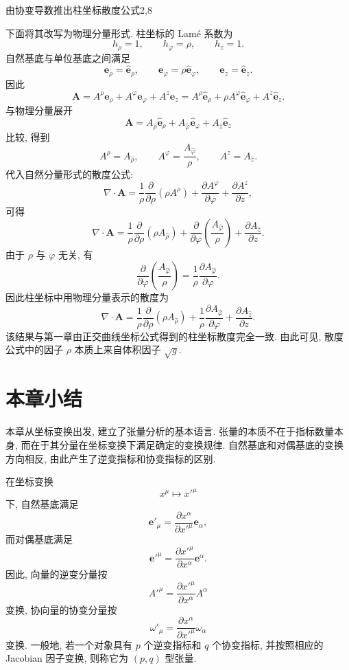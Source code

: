 \begin{example}{由协变导数推出柱坐标散度公式}{2,8}
\begin{solution}
		下面将其改写为物理分量形式. 柱坐标的 Lamé 系数为
		\[
		h_{\rho}=1,
		\qquad
		h_{\varphi}=\rho,
		\qquad
		h_{z}=1.
		\]
		自然基底与单位基底之间满足
		\[
		\bm{e}_{\rho}=\hat{\bm{e}}_{\rho},
		\qquad
		\bm{e}_{\varphi}=\rho\hat{\bm{e}}_{\varphi},
		\qquad
		\bm{e}_{z}=\hat{\bm{e}}_{z}.
		\]
		因此
		\[
		\bm{A}
		=
		A^{\rho}\bm{e}_{\rho}
		+
		A^{\varphi}\bm{e}_{\varphi}
		+
		A^{z}\bm{e}_{z}
		=
		A^{\rho}\hat{\bm{e}}_{\rho}
		+
		\rho A^{\varphi}\hat{\bm{e}}_{\varphi}
		+
		A^{z}\hat{\bm{e}}_{z}.
		\]
		与物理分量展开
		\[
		\bm{A}
		=
		A_{\hat{\rho}}\hat{\bm{e}}_{\rho}
		+
		A_{\hat{\varphi}}\hat{\bm{e}}_{\varphi}
		+
		A_{\hat{z}}\hat{\bm{e}}_{z}
		\]
		比较, 得到
		\[
		A^{\rho}=A_{\hat{\rho}},
		\qquad
		A^{\varphi}=\frac{A_{\hat{\varphi}}}{\rho},
		\qquad
		A^{z}=A_{\hat{z}}.
		\]
		代入自然分量形式的散度公式: 
		\[
		\nabla\cdot\bm{A}
		=
		\frac{1}{\rho}
		\frac{\partial}{\partial\rho}(\rho A^{\rho})
		+
		\frac{\partial A^{\varphi}}{\partial\varphi}
		+
		\frac{\partial A^{z}}{\partial z},
		\]
		可得
		\[
		\nabla\cdot\bm{A}
		=
		\frac{1}{\rho}
		\frac{\partial}{\partial\rho}(\rho A_{\hat{\rho}})
		+
		\frac{\partial}{\partial\varphi}
		\left(
		\frac{A_{\hat{\varphi}}}{\rho}
		\right)
		+
		\frac{\partial A_{\hat{z}}}{\partial z}.
		\]
		由于 $\rho$ 与 $\varphi$ 无关, 有
		\[
		\frac{\partial}{\partial\varphi}
		\left(
		\frac{A_{\hat{\varphi}}}{\rho}
		\right)
		=
		\frac{1}{\rho}
		\frac{\partial A_{\hat{\varphi}}}{\partial\varphi}.
		\]
		因此柱坐标中用物理分量表示的散度为
		\[
		\nabla\cdot\bm{A}
		=
		\frac{1}{\rho}
		\frac{\partial}{\partial\rho}(\rho A_{\hat{\rho}})
		+
		\frac{1}{\rho}
		\frac{\partial A_{\hat{\varphi}}}{\partial\varphi}
		+
		\frac{\partial A_{\hat{z}}}{\partial z}.
		\]
		该结果与第一章由正交曲线坐标公式得到的柱坐标散度完全一致. 由此可见, 散度公式中的因子 $\rho$ 本质上来自体积因子 $\sqrt{g}$. 
	\end{solution}
\end{example}

\section{本章小结}

本章从坐标变换出发, 建立了张量分析的基本语言. 张量的本质不在于指标数量本身, 而在于其分量在坐标变换下满足确定的变换规律. 自然基底和对偶基底的变换方向相反, 由此产生了逆变指标和协变指标的区别. 

在坐标变换
\[
x^{\mu}\mapsto x'^{\mu}
\]
下, 自然基底满足
\[
\bm{e}'_{\mu}
=
\frac{\partial x^{\alpha}}{\partial x'^{\mu}}
\bm{e}_{\alpha},
\]
而对偶基底满足
\[
\bm{e}'^{\mu}
=
\frac{\partial x'^{\mu}}{\partial x^{\alpha}}
\bm{e}^{\alpha}.
\]
因此, 向量的逆变分量按
\[
A'^{\mu}
=
\frac{\partial x'^{\mu}}{\partial x^{\alpha}}A^{\alpha}
\]
变换, 协向量的协变分量按
\[
\omega'_{\mu}
=
\frac{\partial x^{\alpha}}{\partial x'^{\mu}}\omega_{\alpha}
\]
变换. 一般地, 若一个对象具有 $p$ 个逆变指标和 $q$ 个协变指标, 并按照相应的 Jacobian 因子变换, 则称它为 $(p,q)$ 型张量. 

